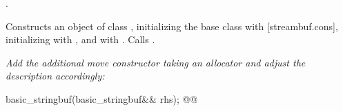 \documentclass[ebook,11pt,article]{memoir}
\renewcommand{\iref}[1]{[#1]}
\begin{document}
\begin{addedblock}
\begin{itemdescr}
\pnum
\mandates {}.

\pnum
\effects Constructs an object of class , initializing the base class with  \iref{streambuf.cons}, initializing  with , and   with . Calls .

\end{itemdescr}


\end{addedblock}



\textit{Add the additional move constructor taking an allocator and adjust the description accordingly:}

\begin{itemdecl}
basic_stringbuf(basic_stringbuf&& rhs);
@@
\end{itemdecl}
\end{document}

